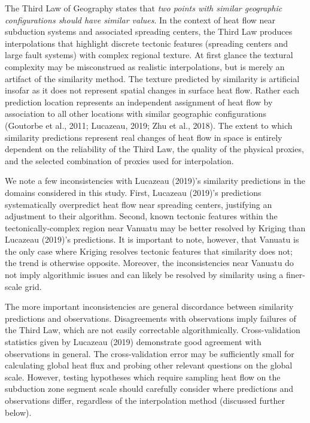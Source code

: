 \documentclass[draft,linenumbers]{agujournal2018}
\begin{document}
The Third Law of Geography states that \emph{two points with similar
geographic configurations should have similar values}. In the context of
heat flow near subduction systems and associated spreading centers, the
Third Law produces interpolations that highlight discrete tectonic
features (spreading centers and large fault systems) with complex
regional texture. At first glance the textural complexity may be
misconstrued as realistic interpolations, but is merely an artifact of
the similarity method. The texture predicted by similarity is artificial
insofar as it does not represent spatial changes in surface heat flow.
Rather each prediction location represents an independent assignment of
heat flow by association to all other locations with similar geographic
configurations (Goutorbe et al., 2011; Lucazeau, 2019; Zhu et al.,
2018). The extent to which similarity predictions represent real changes
of heat flow in space is entirely dependent on the reliability of the
Third Law, the quality of the physical proxies, and the selected
combination of proxies used for interpolation.

We note a few inconsistencies with Lucazeau (2019)'s similarity
predictions in the domains considered in this study. First, Lucazeau
(2019)'s predictions systematically overpredict heat flow near spreading
centers, justifying an adjustment to their algorithm. Second, known
tectonic features within the tectonically-complex region near Vanuatu
may be better resolved by Kriging than Lucazeau (2019)'s predictions. It
is important to note, however, that Vanuatu is the only case where
Kriging resolves tectonic features that similarity does not; the trend
is otherwise opposite. Moreover, the inconsistencies near Vanuatu do not
imply algorithmic issues and can likely be resolved by similarity using
a finer-scale grid.

The more important inconsistencies are general discordance between
similarity predictions and observations. Disagreements with observations
imply failures of the Third Law, which are not easily correctable
algorithmically. Cross-validation statistics given by Lucazeau (2019)
demonstrate good agreement with observations in general. The
cross-validation error may be sufficiently small for calculating global
heat flux and probing other relevant questions on the global scale.
However, testing hypotheses which require sampling heat flow on the
subduction zone segment scale should carefully consider where
predictions and observations differ, regardless of the interpolation
method (discussed further below).
\end{document}
